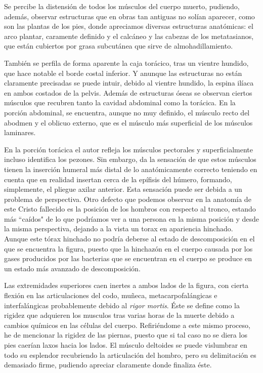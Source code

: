 Se percibe la distensión de todos los músculos del cuerpo muerto, pudiendo, además, observar estructuras que en obras tan antiguas no solían aparecer, como son las plantas de los pies, donde apreciamos diversas estructuras anatómicas: el arco plantar, caramente definido y el calcáneo y las cabezas de los metatasianos, que están cubiertos por grasa subcutánea que sirve de almohadillamiento.

También se perfila de forma aparente la caja torácico, tras un vientre hundido, que hace notable el borde costal inferior. Y anunque las estructuras no están claramente precisadas se puede intuir, debido al vientre hundido, la espina ilíaca en ambos costados de la pelvis. Además de estructuras óseas se observan ciertos músculos que recubren tanto la cavidad abdominal como la torácica. En la porción abdominal, se encuentra, aunque no muy definido, el músculo recto del abodmen y el oblicuo externo, que es el músculo más superficial de los músculos laminares.

En la porción torácica el autor refleja los músculos pectorales y superficialmente incluso identifica los pezones. Sin embargo, da la sensación de que estos músculos tienen la inserción humeral más distal de lo anatómicamente correcto teniendo en cuenta que en realidad insertan cerca de la epífisis del húmero, formando, simplemente, el pliegue axilar anterior. Esta sensación puede ser debida a un problema de perspectiva. Otro defecto que podemos observar en la anatomía de este Cristo fallecido es la posición de los hombros con respecto al tronco, estando más ``caídos" de lo que podríamos ver a una persona en la misma posición y desde la misma perspectiva, dejando a la vista un torax en apariencia hinchado. Aunque este tórax hinchado no podría deberse al estado de descomposición en el que se encuentra la figura, puesto que la hinchazón en el cuerpo causada por los gases producidos por las bacterias que se encuentran en el cuerpo se produce en un estado más avanzado de descomposición.

Las extremidades superiores caen inertes a ambos lados de la figura, con cierta flexión en las articulaciones del codo, muñeca, metacarpofalángicas e interfalángicas probablemente debido al \textit{rigor mortis}. Éste se define como la rigidez que adquieren los musculos tras varias horas de la muerte debido a cambios químicos en las células del cuerpo. Refiriéndome a este mismo proceso, he de mencionar la rigidez de las piernas, puesto que si tal caso no se diera los pies caerían laxos hacia los lados. El músculo deltoides se puede vislumbrar en todo su esplendor  recubriendo la articulación del hombro, pero su delimitación es demasiado firme, pudiendo apreciar claramente donde finaliza éste.
